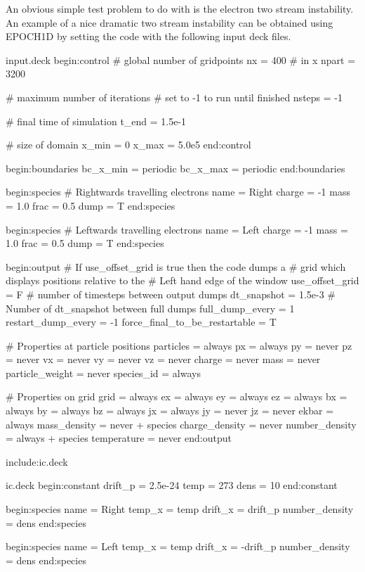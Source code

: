 An obvious simple test problem to do with {\EPOCH} is the electron two stream
instability. An example of a nice dramatic two stream instability can be
obtained using EPOCH1D by setting the code with the following input deck
files.
\begin{lboxverbatim}{input.deck}
begin:control
   # global number of gridpoints
   nx = 400 # in x
   npart = 3200

   # maximum number of iterations
   # set to -1 to run until finished
   nsteps = -1

   # final time of simulation
   t_end = 1.5e-1

   # size of domain
   x_min = 0
   x_max = 5.0e5
end:control

begin:boundaries
   bc_x_min = periodic
   bc_x_max = periodic
end:boundaries

begin:species
   # Rightwards travelling electrons
   name = Right
   charge = -1
   mass = 1.0
   frac = 0.5
   dump = T
end:species

begin:species
   # Leftwards travelling electrons
   name = Left
   charge = -1
   mass = 1.0
   frac = 0.5
   dump = T
end:species

begin:output
   # If use_offset_grid is true then the code dumps a
   # grid which displays positions relative to the
   # Left hand edge of the window
   use_offset_grid = F
   # number of timesteps between output dumps
   dt_snapshot = 1.5e-3
   # Number of dt_snapshot between full dumps
   full_dump_every = 1
   restart_dump_every = -1
   force_final_to_be_restartable = T

   # Properties at particle positions
   particles = always
   px = always
   py = never
   pz = never
   vx = never
   vy = never
   vz = never
   charge = never
   mass = never
   particle_weight = never
   species_id = always

   # Properties on grid
   grid = always
   ex = always
   ey = always
   ez = always
   bx = always
   by = always
   bz = always
   jx = always
   jy = never
   jz = never
   ekbar = always
   mass_density = never + species
   charge_density = never
   number_density = always + species
   temperature = never
end:output

include:ic.deck
\end{lboxverbatim}

\begin{lboxverbatim}{ic.deck}
begin:constant
   drift_p = 2.5e-24
   temp = 273
   dens = 10
end:constant

begin:species
   name = Right
   temp_x = temp
   drift_x = drift_p
   number_density = dens
end:species

begin:species
   name = Left
   temp_x = temp
   drift_x = -drift_p
   number_density = dens
end:species
\end{lboxverbatim}

